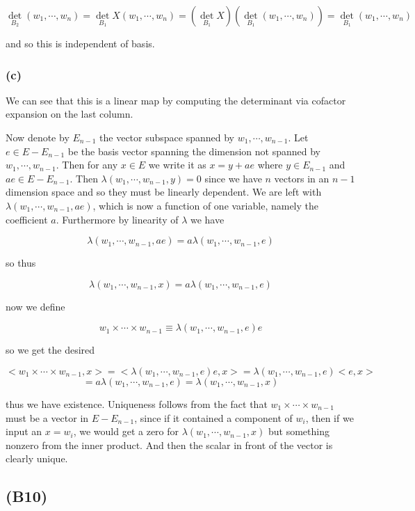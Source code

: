 \documentclass{article}
\begin{document}
\[\det_{B_2} (w_1,\cdots,w_n) = \det_{B_1} X(w_1,\cdots,w_n) = \left (\det_{B_1} X\right) \left(\det_{B_1} (w_1,\cdots,w_n)\right) = \det_{B_1} (w_1,\cdots,w_n)\]

and so this is independent of basis. 

\subsubsection{(c)}

We can see that this is a linear map by computing the determinant via cofactor expansion on the last column. 

Now denote by $E_{n-1}$ the vector subspace spanned by $w_1,\cdots,w_{n-1}$. Let $e \in E - E_{n-1}$ be the basis vector spanning the dimension not spanned by $w_1,\cdots,w_{n-1}$. Then for any $x \in E$ we write it as $x = y + ae$ where $y \in E_{n-1}$ and $ae \in E - E_{n-1}$. Then $\lambda(w_1,\cdots,w_{n-1},y) = 0$ since we have $n$ vectors in an $n-1$ dimension space and so they must be linearly dependent. We are left with $\lambda(w_1,\cdots,w_{n-1},ae)$, which is now a function of one variable, namely the coefficient $a$. Furthermore by linearity of $\lambda$ we have 

\[ \lambda(w_1,\cdots,w_{n-1},ae) = a \lambda(w_1,\cdots,w_{n-1},e) \]

so thus 

\[ \lambda(w_1,\cdots,w_{n-1},x) = a \lambda(w_1,\cdots,w_{n-1},e) \]

now we define

\[ w_1 \times \cdots \times w_{n-1} \equiv \lambda(w_1,\cdots,w_{n-1},e) e\]

so we get the desired 

\[ <w_1 \times \cdots \times w_{n-1}, x> = < \lambda(w_1,\cdots,w_{n-1},e) e, x> = \lambda(w_1,\cdots,w_{n-1},e) <e, x> \]
\[= a \lambda(w_1,\cdots,w_{n-1},e) = \lambda(w_1,\cdots,w_{n-1},x)\]

thus we have existence. Uniqueness follows from the fact that $w_1 \times \cdots \times w_{n-1}$ must be a vector in $E - E_{n-1}$, since if it contained a component of $w_i$, then if we input an $x = w_i$, we would get a zero for $\lambda(w_1,\cdots,w_{n-1},x)$ but something nonzero from the inner product. And then the scalar in front of the vector is clearly unique. 


\subsection{(B10)}
\end{document}
